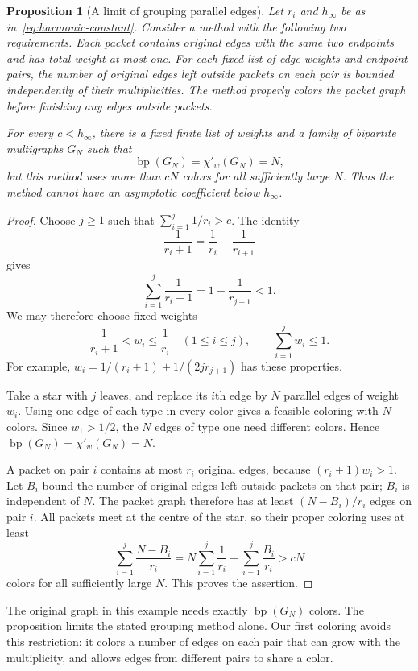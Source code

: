 \documentclass[11pt]{article}
\newtheorem{proposition}[theorem]{Proposition}
\theoremstyle{definition}\newtheorem{algorithm}{Algorithm}[section]
\numberwithin{equation}{section}
\theoremstyle{remark}\newtheorem*{remark}{Remark}
\newcommand{\bp}{\operatorname{bp}}
\begin{document}
\begin{proposition}[A limit of grouping parallel edges]\label{prop:packet-method-limit}
Let $r_i$ and $h_\infty$ be as in~\eqref{eq:harmonic-constant}.
Consider a method with the following two requirements. Each packet
contains original edges with the same two endpoints and has total weight
at most one. For each fixed list of edge weights and endpoint pairs,
the number of original edges left outside packets on each pair is bounded
independently of their multiplicities. The method properly colors the
packet graph before finishing any edges outside packets.

For every $c<h_\infty$, there is a fixed finite list of weights and a family of
bipartite multigraphs $G_N$ such that
\[
 \bp(G_N)=\chi'_w(G_N)=N,
\]
but this method uses more than $cN$ colors for all sufficiently large
$N$. Thus the method cannot have an asymptotic coefficient below $h_\infty$.
\end{proposition}
\begin{proof}
Choose $j\ge1$ such that $\sum_{i=1}^{j}1/r_i>c$. The identity
\[
 \frac1{r_i+1}=\frac1{r_i}-\frac1{r_{i+1}}
\]
gives
\[
 \sum_{i=1}^{j}\frac1{r_i+1}=1-\frac1{r_{j+1}}<1.
\]
We may therefore choose fixed weights
\[
 \frac1{r_i+1}<w_i\le\frac1{r_i}
 \quad(1\le i\le j),\qquad
 \sum_{i=1}^{j}w_i\le1.
\]
For example, $w_i=1/(r_i+1)+1/(2jr_{j+1})$ has these properties.

Take a star with $j$ leaves, and replace its $i$th edge by $N$ parallel
edges of weight $w_i$. Using one edge of each type in every color gives
a feasible coloring with $N$ colors. Since $w_1>1/2$, the $N$ edges of
type one need different colors. Hence $\bp(G_N)=\chi'_w(G_N)=N$.

A packet on pair $i$ contains at most $r_i$ original edges, because
$(r_i+1)w_i>1$. Let $B_i$ bound the number of original edges left outside
packets on that pair; $B_i$ is independent of $N$. The packet graph
therefore has at least $(N-B_i)/r_i$ edges on pair $i$. All packets meet
at the centre of the star, so their proper coloring uses at least
\[
 \sum_{i=1}^{j}\frac{N-B_i}{r_i}
 =N\sum_{i=1}^{j}\frac1{r_i}-\sum_{i=1}^{j}\frac{B_i}{r_i}
 >cN
\]
colors for all sufficiently large $N$. This proves the assertion.
\end{proof}

The original graph in this example needs exactly $\bp(G_N)$ colors.
The proposition limits the stated grouping method alone. Our first
coloring avoids this restriction: it colors a number of edges on
each pair that can grow with the multiplicity, and allows edges from
different pairs to share a color.
\end{document}
